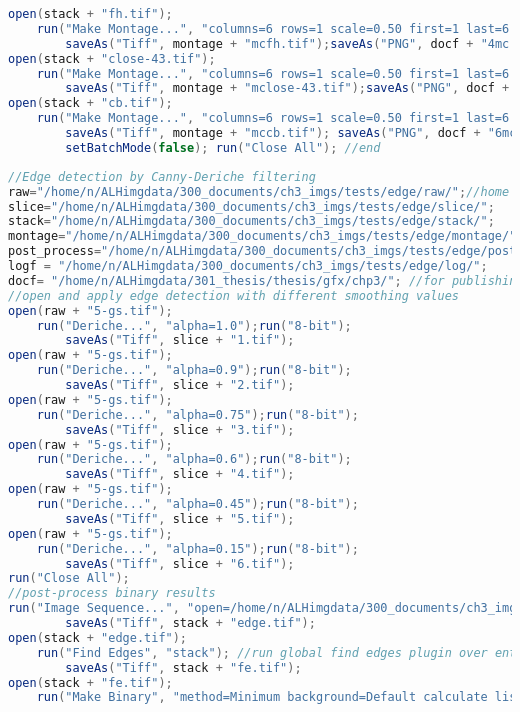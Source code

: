 \begin{lstlisting}[language=java, caption=Otsu thresholding on variable nest images., label=cd:threshold-variable-post]
open(stack + "fh.tif"); 
	run("Make Montage...", "columns=6 rows=1 scale=0.50 first=1 last=6 increment=1 border=4 font=20 label");
		saveAs("Tiff", montage + "mcfh.tif");saveAs("PNG", docf + "4mc.png");
open(stack + "close-43.tif");
	run("Make Montage...", "columns=6 rows=1 scale=0.50 first=1 last=6 increment=1 border=4 font=20 label");
		saveAs("Tiff", montage + "mclose-43.tif");saveAs("PNG", docf + "5mc.png");
open(stack + "cb.tif");
	run("Make Montage...", "columns=6 rows=1 scale=0.50 first=1 last=6 increment=1 border=4 font=20 label");
		saveAs("Tiff", montage + "mccb.tif"); saveAs("PNG", docf + "6mc.png");
		setBatchMode(false); run("Close All"); //end
\end{lstlisting}

\begin{lstlisting}[language=java, caption=Segmentation by edge detection., label=cd:segment-edge]
//Edge detection by Canny-Deriche filtering
raw="/home/n/ALHimgdata/300_documents/ch3_imgs/tests/edge/raw/";//home dir 
slice="/home/n/ALHimgdata/300_documents/ch3_imgs/tests/edge/slice/"; 
stack="/home/n/ALHimgdata/300_documents/ch3_imgs/tests/edge/stack/"; 
montage="/home/n/ALHimgdata/300_documents/ch3_imgs/tests/edge/montage/"; 
post_process="/home/n/ALHimgdata/300_documents/ch3_imgs/tests/edge/post_process/"; 
logf = "/home/n/ALHimgdata/300_documents/ch3_imgs/tests/edge/log/"; 
docf= "/home/n/ALHimgdata/301_thesis/thesis/gfx/chp3/"; //for publishing images
//open and apply edge detection with different smoothing values
open(raw + "5-gs.tif");
	run("Deriche...", "alpha=1.0");run("8-bit");
		saveAs("Tiff", slice + "1.tif");
open(raw + "5-gs.tif");
	run("Deriche...", "alpha=0.9");run("8-bit");
		saveAs("Tiff", slice + "2.tif");
open(raw + "5-gs.tif");
	run("Deriche...", "alpha=0.75");run("8-bit");
		saveAs("Tiff", slice + "3.tif");
open(raw + "5-gs.tif");
	run("Deriche...", "alpha=0.6");run("8-bit");
		saveAs("Tiff", slice + "4.tif"); 
open(raw + "5-gs.tif");
	run("Deriche...", "alpha=0.45");run("8-bit");
		saveAs("Tiff", slice + "5.tif");
open(raw + "5-gs.tif");
	run("Deriche...", "alpha=0.15");run("8-bit");
		saveAs("Tiff", slice + "6.tif"); 
run("Close All");
//post-process binary results
run("Image Sequence...", "open=/home/n/ALHimgdata/300_documents/ch3_imgs/tests/edge/slice/1.tif sort");
		saveAs("Tiff", stack + "edge.tif");
open(stack + "edge.tif");
	run("Find Edges", "stack"); //run global find edges plugin over entire image stack
    	saveAs("Tiff", stack + "fe.tif");
open(stack + "fe.tif");
	run("Make Binary", "method=Minimum background=Default calculate list"); //invert binary 

\end{lstlisting}
